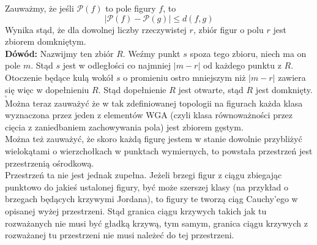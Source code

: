 \documentclass[a4paper, 12pt, twosided]{article}
\newcommand{\todo}[1]{\hfill \break \textbf{\Huge \textcolor{violet}{TO DO: #1} \hfill \break}
\normalsize}
\begin{document}
Zauważmy, że jeśli $\mathcal{P}(f)$ to pole figury $f$, to
\begin{equation}
    |\mathcal{P}(f) - \mathcal{P}(g)| \leq d(f, g)
\end{equation}
Wynika stąd, że dla dowolnej liczby rzeczywistej $r$, zbiór figur o polu $r$ jest zbiorem 
 domkniętym.
\\
\textbf{Dówód:} Nazwijmy ten zbiór $R$. Weźmy punkt $s$ spoza tego zbioru, niech ma on pole $m$.
Stąd $s$ jest w odległości co najmniej $|m-r|$ od każdego punktu z $R$. \\
Otoczenie będące kulą wokół $s$ o promieniu ostro mniejszym niż $|m - r|$ zawiera się więc w 
dopełnieniu $R$.
 Stąd dopełnienie $R$ jest otwarte, stąd $R$ jest domknięty. $_\square$
\\
Można teraz zauważyć że w tak zdefiniowanej topologii na figurach każda klasa wyznaczona przez 
 jeden 
z
elementów WGA (czyli klasa równoważności przez cięcia z zaniedbaniem zachowywania pola) jest 
 zbiorem 
gęstym.
\\
Można też zauważyć, że skoro każdą figurę jestem w stanie dowolnie przybliżyć wielokątami o 
wierzchołkach
w punktach wymiernych, to powstała przestrzeń jest przestrzenią ośrodkową.
\\
Przestrzeń ta nie jest jednak zupełna. Jeżeli brzegi figur z ciągu zbiegając punktowo do jakieś 
ustalonej
figury, być może szerszej klasy (na przykład o brzegach będących krzywymi Jordana), to figury te
tworzą ciąg Cauchy'ego w opisanej wyżej przestrzeni. Stąd granica ciągu krzywych takich jak tu 
rozważanych 
nie musi
 być gładką krzywą, tym samym, granica ciągu krzywych z rozważanej tu przestrzeni nie musi 
 należeć do tej przestrzeni.
%
%
%
\nocite{*}
{}

\end{document}
